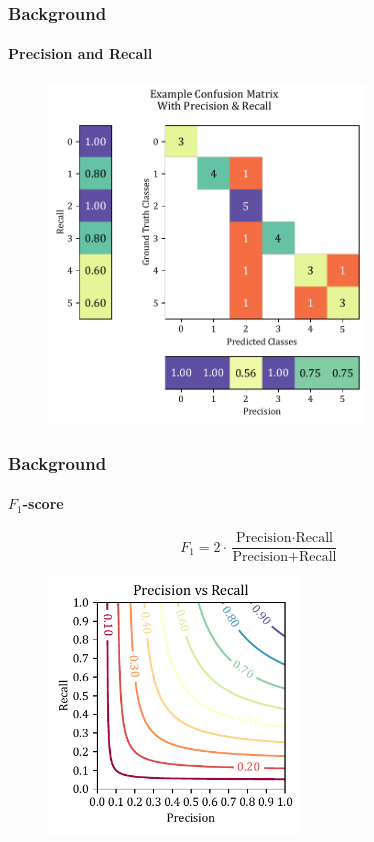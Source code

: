 \documentclass[xcolor={svgnames,table},10pt,fleqn]{beamer}
\begin{document}
\begin{frame}
    \frametitle{Background}
    \framesubtitle{Precision and Recall}
    \begin{figure}
        \includegraphics[width=0.75\textwidth]{imgs/conf_mat_prec_recall.pdf}
    \end{figure}
\end{frame}

\begin{frame}
    \frametitle{Background}
    \framesubtitle{$F_1$-score}
    $$ F_{1} = 2 \cdot \frac{ \text{Precision} \cdot \text{Recall} }{ \text{Precision} + \text{Recall} } $$
    \begin{figure}
        \includegraphics[width=0.6\textwidth]{imgs/04_precision_recall_f1.pdf}
    \end{figure}
\end{frame}
\end{document}
